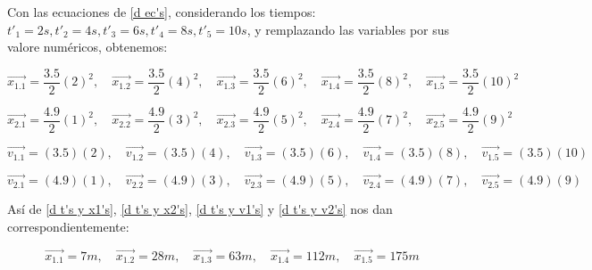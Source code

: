 \documentclass[12pt,letterpaper]{article}
\begin{document}
\begin{enumerate}
\begin{enumerate}
            Con las ecuaciones de \ref{d ec's}, considerando los tiempos: $t'_{1}=2s,t'_{2}=4s,t'_{3}=6s,t'_{4}=8s,t'_{5}=10s$, y remplazando las variables por sus valore numéricos, obtenemos:
    
                \begin{equation}
                    \label{d t's y x1's}
                    \vec{x_{1.1}}=\frac{3.5}{2}(2)^{2},\quad
                    \vec{x_{1.2}}=\frac{3.5}{2}(4)^{2},\quad
                    \vec{x_{1.3}}=\frac{3.5}{2}(6)^{2},\quad
                    \vec{x_{1.4}}=\frac{3.5}{2}(8)^{2},\quad
                    \vec{x_{1.5}}=\frac{3.5}{2}(10)^{2}
                \end{equation}
                
                \begin{equation}
                    \label{d t's y x2's}
                    \vec{x_{2.1}}=\frac{4.9}{2}(1)^{2},\quad
                    \vec{x_{2.2}}=\frac{4.9}{2}(3)^{2},\quad
                    \vec{x_{2.3}}=\frac{4.9}{2}(5)^{2},\quad
                    \vec{x_{2.4}}=\frac{4.9}{2}(7)^{2},\quad
                    \vec{x_{2.5}}=\frac{4.9}{2}(9)^{2}
                \end{equation}
                
                \begin{equation}
                    \label{d t's y v1's}
                    \vec{v_{1.1}}=(3.5)(2),\quad
                    \vec{v_{1.2}}=(3.5)(4),\quad
                    \vec{v_{1.3}}=(3.5)(6),\quad
                    \vec{v_{1.4}}=(3.5)(8),\quad
                    \vec{v_{1.5}}=(3.5)(10)
                \end{equation}
                
                \begin{equation}
                    \label{d t's y v2's}
                    \vec{v_{2.1}}=(4.9)(1),\quad
                    \vec{v_{2.2}}=(4.9)(3),\quad
                    \vec{v_{2.3}}=(4.9)(5),\quad
                    \vec{v_{2.4}}=(4.9)(7),\quad
                    \vec{v_{2.5}}=(4.9)(9)
                \end{equation}

            Así de \ref{d t's y x1's}, \ref{d t's y x2's}, \ref{d t's y v1's} y \ref{d t's y v2's} nos dan correspondientemente:

                \begin{equation}
                    \label{resueltas d t's y x1's}
                    \vec{x_{1.1}}=7m,\quad
                    \vec{x_{1.2}}=28m,\quad
                    \vec{x_{1.3}}=63m,\quad
                    \vec{x_{1.4}}=112m,\quad
                    \vec{x_{1.5}}=175m
                \end{equation}
                

\end{enumerate}
\end{enumerate}
\end{document}
